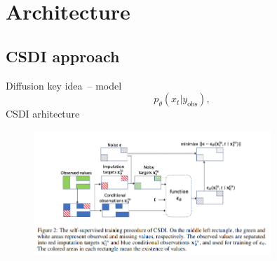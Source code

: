 \documentclass[8pt]{beamer}
\renewcommand{\|}{\ensuremath{\hspace{0.1cm} | \hspace{0.1cm}}}
\begin{document}
    \section{Architecture}
    \subsection{CSDI approach}
    \begin{frame}
            Diffusion key idea~-- model
            \begin{equation}
                p_\theta (x_t|y_{\text{obs}}),
                \label{eq:8}
            \end{equation}
            CSDI arhitecture
            \begin{figure}[h]
                \centering
                \includegraphics[width=0.8\textwidth]{csdi_architect.png}
            \end{figure}
    \end{frame}
\end{document}
